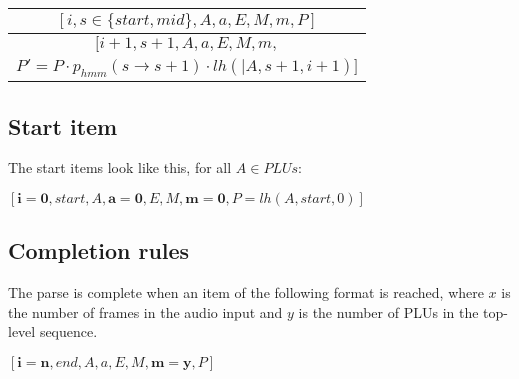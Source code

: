 \documentclass[12pt,letterpaper]{article}
\newcommand{\myrule}[2]{\begin{tabular}{c}
#1 \\
\hline
#2
\end{tabular}}
\newcommand{\toprulecomp}[8]{
    $[#1, #2, #3, #4, #5, #6, #7, #8 ]$
}
\newcommand{\botrulecomp}[8]{
    $[#1, #2, #3, #4, #5, #6, #7,$ \\
    $#8 ]$
}
\begin{document}
\myrule{
	\toprulecomp{i}{s\in\{start,mid\}}{A}{a}{E}{M}{m}{P}
	}
	{
	\botrulecomp{i+1}{s+1}{A}{a}{E}{M}{m}{P'= P \cdot p_{hmm}(s \rightarrow s+1) \cdot lh(|A,s+1,i+1)}
	}
	
\subsection{Start item}

The start items look like this, for all $A\in {PLUs}$:	

\toprulecomp{\mathbf{i=0}}{start}{A}{\mathbf{a=0}}{E}{M}{\mathbf{m=0}}{P=lh(A,start,0)}
	
\subsection{Completion rules}

The parse is complete when an item of the following format is reached, where $x$ is the number of frames in the audio input and $y$ is the number of PLUs in the top-level sequence.

\toprulecomp{\mathbf{i=n}}{end}{A}{a}{E}{M}{\mathbf{m=y}}{P}
\end{document}
